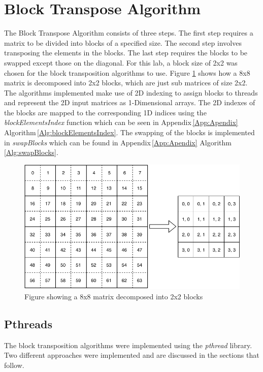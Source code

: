 \documentclass[10pt, onecolumn]{article}
\begin{document}
\section{Block Transpose Algorithm}
%
The Block Transpose Algorithm consists of three steps. The first step requires a matrix to be divided into blocks of a specified size. The second step involves transposing the elements in the blocks. The last step requires the blocks to be swapped except those on the diagonal. For this lab, a block size of 2x2 was chosen for the block transposition algorithms to use. Figure \ref{fig:BlockDecomposition} shows how a 8x8 matrix is decomposed into 2x2 blocks, which are just sub matrices of size 2x2. The algorithms implemented make use of 2D indexing to assign blocks to threads and represent the 2D input matrices as 1-Dimensional arrays. The 2D indexes of the blocks are mapped to the corresponding 1D indices using the \emph{blockElementsIndex} function which can be seen in Appendix\,\ref{App:Apendix} Algorithm\,\ref{Alg:blockElementsIndex}. The swapping of the blocks is implemented in \emph{swapBlocks} which can be found in Appendix\,\ref{App:Apendix} Algorithm\,\ref{Alg:swapBlocks}.
%
\begin{figure}[H]
    \centering
    \includegraphics[scale=0.7]{Documentation/BlockDecomposition.pdf}
    \caption{Figure showing a 8x8 matrix decomposed into 2x2 blocks}
    \label{fig:BlockDecomposition}
\end{figure}
%
\subsection{Pthreads}
%
The block transposition algorithms were implemented using the \emph{pthread} library. Two different approaches were implemented and are discussed in the sections that follow.
%
\end{document}
